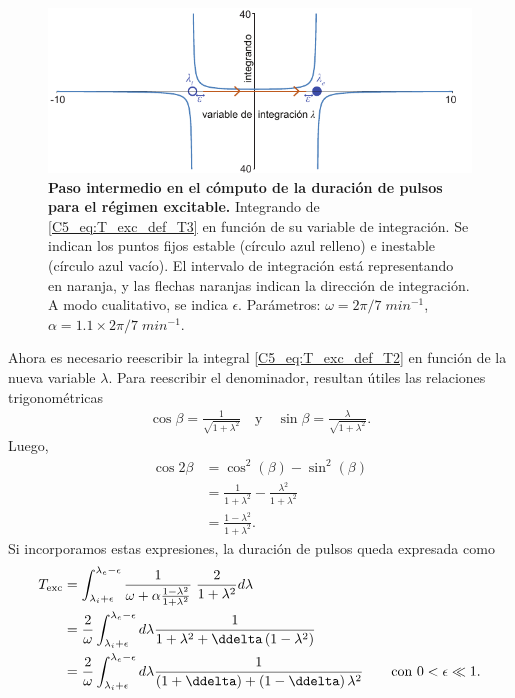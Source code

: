 { \begin{figure}
    \centering
    \includegraphics[width=1\columnwidth]{figures/chapter5/C5_T_exc_T3.pdf} 
    \caption{\textbf{Paso intermedio en el cómputo de la duración de pulsos para el régimen excitable.} Integrando de \ref{C5_eq:T_exc_def_T3} en función de su variable de integración. Se indican los puntos fijos estable \xxe (círculo azul relleno) e inestable \xxi (círculo azul vacío). El intervalo de integración está representando en naranja, y  las flechas naranjas indican la dirección de integración. A modo cualitativo, se indica $\epsilon$. Parámetros: $\omega=2\pi/7\;min^{-1}$, $\alpha = 1.1 \times 2\pi/7\;min^{-1}$.}
    \label{C5_fig:T_exc_T3}
\end{figure}


Ahora es necesario reescribir la integral \ref{C5_eq:T_exc_def_T2} en función de la nueva variable $\lambda$. Para reescribir el denominador, resultan útiles las relaciones trigonométricas
\begin{align}
    \cos{\beta} = \frac{1}{\sqrt{1+\lambda^2}} \quad \text{y} \quad \sin{\beta} = \frac{\lambda}{\sqrt{1+\lambda^2}}.
\end{align}
Luego,
\begin{align}
    \cos{2 \beta} &= \cos^2(\beta)-\sin^2(\beta)\\
    &=\frac{1}{1+\lambda^2} -  \frac{\lambda^2}{1+\lambda^2} \nonumber\\
    &= \frac{1-\lambda^2}{1+\lambda^2}.
\end{align}
Si incorporamos estas expresiones, la duración de pulsos queda expresada como
\begin{align}
    T_{\text{exc}} &= \int_{\lambda_i+\epsilon}^{\lambda_e -\epsilon} \frac{1}{\omega + \alpha \frac{1-\lambda^2}{1+\lambda^2}} \; \frac{2}{1+\lambda^2} d\lambda \\ 
    &= \frac{2}{\omega}\int_{\lambda_i+\epsilon}^{\lambda_e -\epsilon} d\lambda \frac{1}{1+\lambda^2+\ddelta \left(1-\lambda^2 \right)} \nonumber\\
    &= \frac{2}{\omega}\int_{\lambda_i+\epsilon}^{\lambda_e -\epsilon} d\lambda \frac{1}{\left(1+\ddelta \right) + \left( 1-\ddelta\right) \lambda^2} \qquad \text{con } 0<\epsilon \ll 1. \label{C5_eq:T_exc_def_T3}
\end{align}

}
